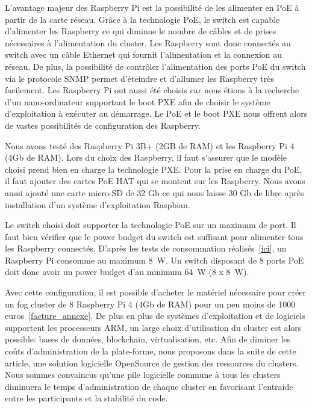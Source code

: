 \documentclass[letterpaper, 10 pt, conference]{ieeeconf}
\begin{document}
L'avantage majeur des Raspberry Pi est la possibilité de les alimenter en PoE à partir de la carte réseau. Grâce à la technologie PoE, le switch est capable d'alimenter les  Raspberry ce qui diminue le nombre de câbles et de prises nécessaires à l'alimentation du cluster. Les Raspberry sont donc connectés au switch avec un câble Ethernet qui fournit l'alimentation et la connexion au réseau. De plus, la possibilité de contrôler l'alimentation des ports PoE du switch via le protocole SNMP permet d'éteindre et d'allumer les Raspberry très facilement. Les Raspberry Pi ont aussi été choisis car nous étions à la recherche d'un nano-ordinateur supportant le boot PXE afin de choisir le système d'exploitation à exécuter au démarrage. Le PoE et le boot PXE nous offrent alors de vastes possibilités de configuration des Raspberry.

Nous avons testé des Raspberry Pi 3B+ (2GB de RAM) et les Raspberry Pi 4 (4Gb de RAM). Lors du choix des Raspberry, il faut s'assurer que le modèle choisi prend bien en charge la technologie PXE. Pour la prise en charge du PoE, il faut ajouter des cartes PoE HAT qui se montent sur les Raspberry. Nous avons aussi ajouté une carte micro-SD de 32 Gb ce qui nous laisse 30 Gb de libre après installation d'un système d'exploitation Raspbian.

Le switch choisi doit supporter la technologie PoE sur un maximum de port. Il faut bien vérifier que le power budget du switch est suffisant pour alimenter tous les Raspberry connectés. D'après les tests de consommation réalisés~\ref{ici}, un Raspberry Pi consomme au maximum 8~W. Un switch disposant de 8 ports PoE doit donc avoir un power budget d'au minimum 64~W (8 x 8~W).

Avec cette configuration, il est possible d'acheter le matériel nécessaire pour créer un fog cluster de 8 Raspberry Pi 4 (4Gb de RAM) pour un peu moins de 1000 euros~\ref{facture_annexe}. De plus en plus de systèmes d'exploitation et de logiciels supportent les processeurs ARM, un large choix d'utilisation du cluster est alors possible: bases de données, blockchain, virtualisation, etc. Afin de diminer les coûts d'administration de la plate-forme, nous proposons dans la suite de cette article, une solution logicielle OpenSource de gestion des ressources du clusters. Nous sommes convaincus qu'une pile logicielle commune à tous les clusters diminuera le temps d'administration de chaque cluster en favorisant l'entraide entre les participants et la stabilité du code.

\end{document}
